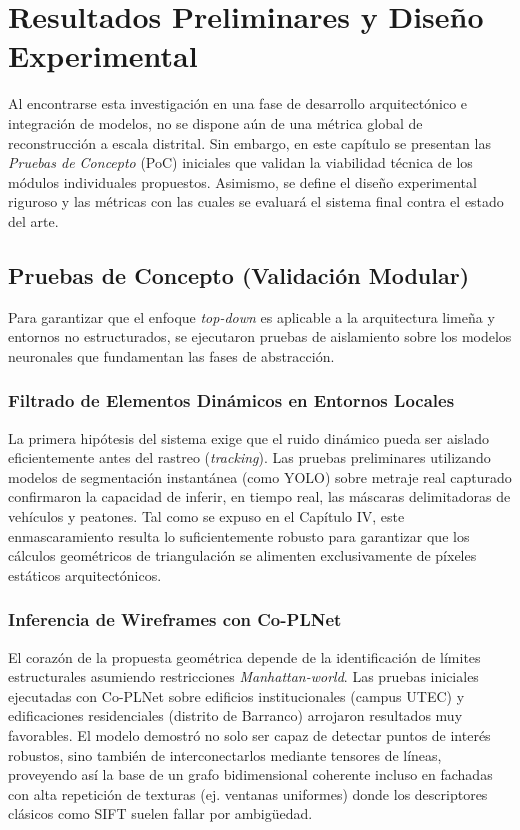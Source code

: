 \chapter{Resultados Preliminares y Diseño Experimental}

Al encontrarse esta investigación en una fase de desarrollo arquitectónico e integración de modelos, no se dispone aún de una métrica global de reconstrucción a escala distrital. Sin embargo, en este capítulo se presentan las \textit{Pruebas de Concepto} (PoC) iniciales que validan la viabilidad técnica de los módulos individuales propuestos. Asimismo, se define el diseño experimental riguroso y las métricas con las cuales se evaluará el sistema final contra el estado del arte.

\section{Pruebas de Concepto (Validación Modular)}

Para garantizar que el enfoque \textit{top-down} es aplicable a la arquitectura limeña y entornos no estructurados, se ejecutaron pruebas de aislamiento sobre los modelos neuronales que fundamentan las fases de abstracción.

\subsection{Filtrado de Elementos Dinámicos en Entornos Locales}
La primera hipótesis del sistema exige que el ruido dinámico pueda ser aislado eficientemente antes del rastreo (\textit{tracking}). Las pruebas preliminares utilizando modelos de segmentación instantánea (como YOLO) sobre metraje real capturado confirmaron la capacidad de inferir, en tiempo real, las máscaras delimitadoras de vehículos y peatones. Tal como se expuso en el Capítulo IV, este enmascaramiento resulta lo suficientemente robusto para garantizar que los cálculos geométricos de triangulación se alimenten exclusivamente de píxeles estáticos arquitectónicos.

\subsection{Inferencia de Wireframes con Co-PLNet}
El corazón de la propuesta geométrica depende de la identificación de límites estructurales asumiendo restricciones \textit{Manhattan-world}. Las pruebas iniciales ejecutadas con Co-PLNet sobre edificios institucionales (campus UTEC) y edificaciones residenciales (distrito de Barranco) arrojaron resultados muy favorables. El modelo demostró no solo ser capaz de detectar puntos de interés robustos, sino también de interconectarlos mediante tensores de líneas, proveyendo así la base de un grafo bidimensional coherente incluso en fachadas con alta repetición de texturas (ej. ventanas uniformes) donde los descriptores clásicos como SIFT suelen fallar por ambigüedad.

